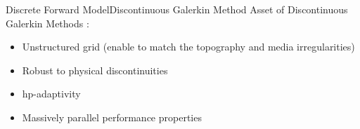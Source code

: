 \begin{frame}{Discrete Forward Model}{Discontinuous Galerkin Method}
  Asset of Discontinuous Galerkin Methods : \\

  \begin{itemize}
  \item Unstructured grid (enable to match the topography and media irregularities)
  \item Robust to physical discontinuities
  \item hp-adaptivity
  \item Massively parallel performance properties
  \end{itemize}

  \begin{figure}[H]
    \centering
    \subfigure[h-adaptivity]{
      
}
    \hspace{1cm}
\end{figure}
\end{frame}
